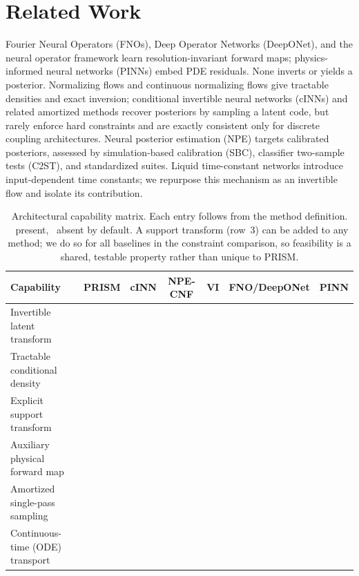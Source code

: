 \documentclass{article}
\newcommand{\cmark}{\ding{51}}
\newcommand{\xmark}{\ding{55}}
\begin{document}
\section{Related Work}
\label{sec:related}
Fourier Neural Operators (FNOs), Deep Operator Networks (DeepONet), and the neural
operator framework learn resolution-invariant forward maps; physics-informed
neural networks (PINNs) embed PDE residuals. None inverts or yields a posterior.
Normalizing flows and continuous normalizing flows give tractable densities and
exact inversion; conditional invertible neural networks (cINNs) and related
amortized methods recover posteriors by sampling a latent code, but rarely enforce
hard constraints and are exactly consistent only for discrete coupling
architectures. Neural posterior estimation (NPE) targets calibrated posteriors,
assessed by simulation-based calibration (SBC), classifier two-sample tests
(C2ST), and standardized suites. Liquid time-constant networks introduce
input-dependent time constants; we repurpose this mechanism as an invertible flow
and isolate its contribution.

\begin{table}[t]
\centering
\caption{Architectural capability matrix. Each entry follows from the method
definition. \cmark{}~present, \xmark{}~absent by default. A support transform
(row~3) can be added to any method; we do so for all baselines in the constraint
comparison, so feasibility is a shared, testable property rather than unique to
PRISM.}
\label{tab:novelty}
\begin{tabular}{lcccccc}
\toprule
Capability & PRISM & cINN & NPE-CNF & VI & FNO/DeepONet & PINN \\
\midrule
Invertible latent transform      & \cmark & \cmark & \cmark & \cmark & \xmark & \xmark \\
Tractable conditional density    & \cmark & \cmark & \cmark & \cmark & \xmark & \xmark \\
Explicit support transform       & \cmark & \xmark & \xmark & \xmark & \xmark & \xmark \\
Auxiliary physical forward map    & \cmark & \xmark & \xmark & \xmark & \cmark & \cmark \\
Amortized single-pass sampling   & \cmark & \cmark & \cmark & \cmark & \xmark & \xmark \\
Continuous-time (ODE) transport  & \cmark & \xmark & \cmark & \xmark & \xmark & \xmark \\
\bottomrule
\end{tabular}
\end{table}
\end{document}
